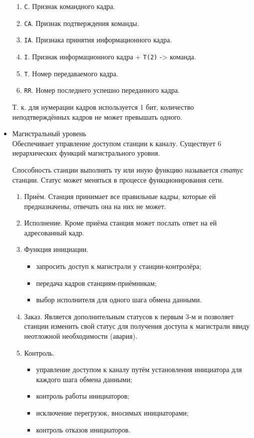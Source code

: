 \documentclass[12pt, russian, oneside, article]{ncc}
\begin{document}
\begin{itemize}
\begin{enumerate}
\item \texttt{С}. Признак командного кадра.
\item \texttt{CA}. Признак подтверждения команды.
\item \texttt{IA}. Признака принятия информационного кадра.
\item \texttt{I}. Признак информационного кадра + \texttt{T(2)} -> команда.
\item \texttt{T}. Номер передаваемого кадра.
\item \texttt{RR}. Номер последнего успешно переданного кадра.
\end{enumerate}

Т. к. для нумерации кадров используется 1 бит, количество неподтверждённых кадров не может превышать одного.


\item Магистральный уровень\\
\label{sec-5_2_3_3}%
Обеспечивает управление доступом станции к каналу. Существует 6 иерархических функций магистрального уровня.

Способность станции выполнять ту или иную функцию называется \emph{статус} станции. Статус может меняться в процессе функционирования сети.

\begin{enumerate}
\item Приём. Станция принимает все правильные кадры, которые ей предназначены, отвечать она на них не может.
\item Исполнение. Кроме приёма станция может послать ответ на ей адресованный кадр.
\item Функция инициации.

\begin{itemize}
\item запросить доступ к магистрали у станции-контролёра;
\item передача кадров станциям-приёмникам;
\item выбор исполнителя для одного шага обмена данными.
\end{itemize}

\item Заказ. Является дополнительным статусов к первым 3-м и позволяет станции изменить свой статус для получения доступа к магистрали ввиду неотложной необходимости (авария).
\item Контроль.

\begin{itemize}
\item управление доступом к каналу путём установления инициатора для каждого шага обмена данными;
\item контроль работы инициаторов;
\item исключение перегрузок, вносимых инициаторами;
\item контроль отказов инициаторов.
\end{itemize}


\end{enumerate}
\end{itemize}
\end{document}
